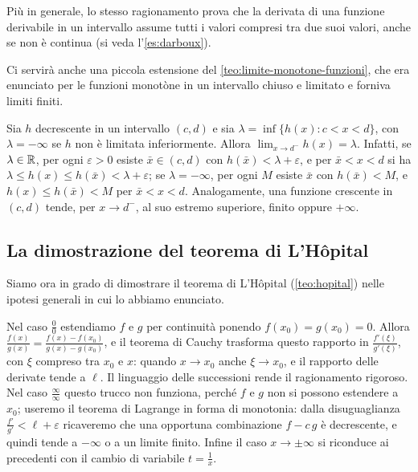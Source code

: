 Più in generale, lo stesso ragionamento prova che la derivata di una funzione
derivabile in un intervallo assume tutti i valori compresi tra due suoi valori, anche
se non è continua (si veda l'\cref{es:darboux}).

Ci servirà anche una piccola estensione del \cref{teo:limite-monotone-funzioni}, che era
enunciato per le funzioni monotòne in un intervallo chiuso e limitato e forniva limiti
finiti.

\begin{osservazione}
\label{oss:monotone-aperto}
Sia $h$ decrescente in un intervallo $(c,d)$ e sia $\lambda=\inf\{h(x): c<x<d\}$, con
$\lambda=-\infty$ se $h$ non è limitata inferiormente. Allora
$\lim_{x\to d^{-}}h(x)=\lambda$. Infatti, se $\lambda\in\mathbb{R}$, per ogni $\varepsilon>0$ esiste
$\bar x\in(c,d)$ con $h(\bar x)<\lambda+\varepsilon$, e per $\bar x<x<d$ si ha
$\lambda\le h(x)\le h(\bar x)<\lambda+\varepsilon$; se $\lambda=-\infty$, per ogni $M$ esiste
$\bar x$ con $h(\bar x)<M$, e $h(x)\le h(\bar x)<M$ per $\bar x<x<d$. Analogamente, una
funzione crescente in $(c,d)$ tende, per $x\to d^{-}$, al suo estremo superiore, finito
oppure $+\infty$.
\end{osservazione}

\subsection{La dimostrazione del teorema di L'Hôpital}

Siamo ora in grado di dimostrare il teorema di L'Hôpital (\cref{teo:hopital}) nelle
ipotesi generali in cui lo abbiamo enunciato.

\begin{strategia}
Nel caso $\frac00$ estendiamo $f$ e $g$ per continuità ponendo $f(x_{0})=g(x_{0})=0$.
Allora $\frac{f(x)}{g(x)}=\frac{f(x)-f(x_{0})}{g(x)-g(x_{0})}$, e il teorema di Cauchy
trasforma questo rapporto in $\frac{f'(\xi)}{g'(\xi)}$, con $\xi$ compreso tra $x_{0}$ e
$x$: quando $x\to x_{0}$ anche $\xi\to x_{0}$, e il rapporto delle derivate tende a
$\ell$. Il linguaggio delle successioni rende il ragionamento rigoroso. Nel caso
$\frac\infty\infty$ questo trucco non funziona, perché $f$ e $g$ non si possono
estendere a $x_{0}$; useremo il teorema di Lagrange in forma di monotonia: dalla
disuguaglianza $\frac{f'}{g'}<\ell+\varepsilon$ ricaveremo che una opportuna combinazione
$f-c\,g$ è decrescente, e quindi tende a $-\infty$ o a un limite finito. Infine il caso
$x\to\pm\infty$ si riconduce ai precedenti con il cambio di variabile $t=\frac1x$.
\end{strategia}

